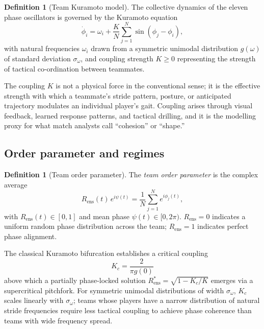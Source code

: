 \documentclass[11pt,twocolumn,a4paper]{article}
\theoremstyle{definition}
\newtheorem{definition}[theorem]{Definition}
\theoremstyle{remark}
\newcommand{\Rens}{R_{\mathrm{ens}}}
\newcommand{\Kc}{K_{c}}
\newcommand{\sigw}{\sigma_{\omega}}
\begin{document}
\begin{definition}[Team Kuramoto model]
\label{def:kuramoto}
The collective dynamics of the eleven phase oscillators is governed
by the Kuramoto equation \citep{kuramoto1984}
\begin{equation}
  \dot{\phi}_i = \omega_i + \frac{K}{N}\sum_{j=1}^{N}
                 \sin(\phi_j - \phi_i),
  \label{eq:kuramoto}
\end{equation}
with natural frequencies $\omega_i$ drawn from a symmetric unimodal
distribution $g(\omega)$ of standard deviation $\sigw$, and coupling
strength $K \geq 0$ representing the strength of tactical
co-ordination between teammates.
\end{definition}

The coupling $K$ is not a physical force in the conventional sense; it
is the effective strength with which a teammate's stride pattern,
posture, or anticipated trajectory modulates an individual player's
gait. Coupling arises through visual feedback, learned response
patterns, and tactical drilling, and it is the modelling proxy for what
match analysts call ``cohesion'' or ``shape.''

\subsection{Order parameter and regimes}

\begin{definition}[Team order parameter]
\label{def:order}
The \emph{team order parameter} is the complex average
\begin{equation}
  \Rens(t)\,e^{i\psi(t)} = \frac{1}{N}\sum_{j=1}^{N} e^{i\phi_j(t)},
  \label{eq:order}
\end{equation}
with $\Rens(t) \in [0,1]$ and mean phase $\psi(t) \in [0, 2\pi)$.
$\Rens = 0$ indicates a uniform random phase distribution across the
team; $\Rens = 1$ indicates perfect phase alignment.
\end{definition}

The classical Kuramoto bifurcation
\citep{kuramoto1984,strogatz2000,acebron2005} establishes a critical
coupling
\begin{equation}
  \Kc = \frac{2}{\pi g(0)}
  \label{eq:Kc}
\end{equation}
above which a partially phase-locked solution
$\Rens^{*} = \sqrt{1 - \Kc/K}$ emerges via a supercritical pitchfork.
For symmetric unimodal distributions of width $\sigw$, $\Kc$ scales
linearly with $\sigw$; teams whose players have a narrow distribution
of natural stride frequencies require less tactical coupling to achieve
phase coherence than teams with wide frequency spread.
\end{document}
